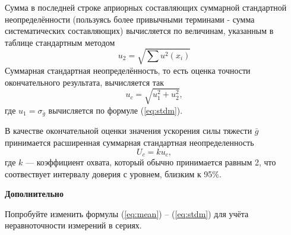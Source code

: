 \documentclass[12pt, a4paper]{article}
\theoremstyle{remark}
\begin{document}
\begin{enumerate}
    Сумма в последней строке априорных составляющих суммарной стандартной неопределённости 
    (пользуясь более привычными
    терминами - сумма систематических составляющих) вычисляется по величинам, указанным в таблице
    стандартным методом
    \begin{equation}
        u_2 =  \sqrt{\sum u^2(x_i)}
    \end{equation}
    Суммарная стандартная неопределённость, то есть оценка точности окончательного результата,
    вычисляется так
    \begin{equation}
        u_c = \sqrt{u_1^2 + u_2^2},
    \end{equation}
    где $u_1 = \sigma_{\bar{g}}$ вычисляется по формуле (\ref{eq:stdm}).

    В качестве окончательной оценки значения ускорения силы тяжести $\bar{g}$ принимается
    расширенная суммарная стандартная неопределенность
    \begin{equation}
        U_c = k u_c,
    \end{equation}
    где $k$ --- коэффициент охвата, который обычно принимается равным 2, что соотвествует 
    интервалу доверия с уровнем, близким к 95\%.
\end{enumerate}

\begin{center}
    \textbf{Дополнительно}
\end{center}

Попробуйте изменить формулы (\ref{eq:mean}) -- (\ref{eq:stdm}) для учёта неравноточности измерений в
сериях.

\end{document}
